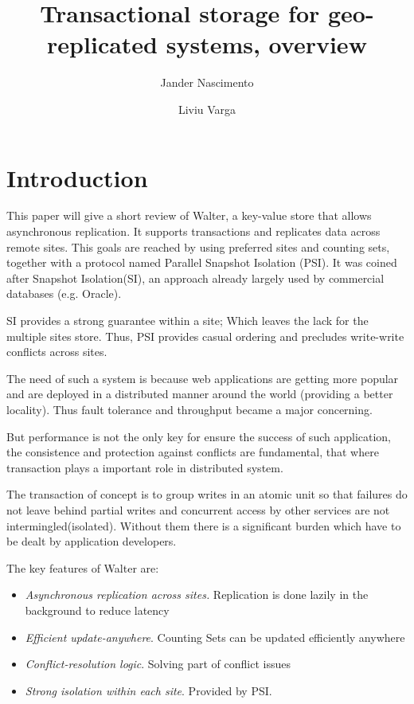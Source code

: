 \documentclass[a4paper]{article}
\begin{document}
\title{Transactional storage for geo-replicated systems, overview}

\author{Jander Nascimento
\and Liviu Varga}

\maketitle


\section{Introduction}
This paper will give a short review of Walter, a key-value store that allows asynchronous replication. It supports transactions and replicates data across remote sites. This goals are reached by using preferred sites and counting sets, together with a protocol named Parallel Snapshot Isolation (PSI). It was coined after Snapshot Isolation(SI), an approach already largely used by commercial databases (e.g. Oracle). 

SI provides a strong guarantee within a site; Which leaves the lack for the multiple sites store. Thus, PSI provides casual ordering and precludes write-write conflicts across sites.

The need of such a system is because web applications are getting more popular and are deployed in a distributed  manner around the world (providing a better locality). Thus fault tolerance and throughput became a major concerning. 

But performance is not the only key for ensure the success of such application, the consistence and protection against conflicts are fundamental, that where transaction plays a important role in distributed system. 

The transaction of concept is to group writes in an atomic unit so that failures do not leave behind partial writes and concurrent access by other services are not intermingled(isolated). Without them there is a significant burden which have to be dealt by application developers. 

The key features of Walter are:

\begin{itemize}
\item \textit{Asynchronous replication across sites.} Replication is done lazily in the background to reduce latency
\item \textit{Efficient update-anywhere}. Counting Sets can be updated efficiently anywhere
\item \textit{Conflict-resolution logic}. Solving part of conflict issues
\item \textit{Strong isolation within each site}. Provided by PSI.
\end{itemize}
          
\end{document}

